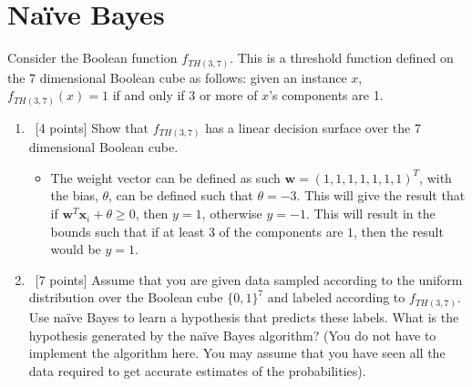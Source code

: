 \section{Na\"ive Bayes}
\label{sec:bayes}
Consider the Boolean function $f_{TH(3,7)}$. This is a threshold
function defined on the 7 dimensional Boolean cube as follows: given
an instance $x$, $f_{TH(3,7)}(x) = 1$ if and only if 3 or more of
$x$'s components are 1.

\begin{enumerate}
\item ~[4 points] Show that $f_{TH(3,7)}$ has a linear decision surface over the 7 dimensional Boolean cube.

\begin{itemize}
\item The weight vector can be defined as such $\mathbf{w}=\left(1,1,1,1,1,1,1\right)^{T}$, with the bias, $\theta$, can be defined such that $\theta = -3$. This will give the result that if $\mathbf{w}^{T}\mathbf{x}_{i}+\theta\geq 0$, then $y=1$, otherwise $y=-1$. This will result in the bounds such that if at least $3$ of the components are $1$, then the result would be $y=1$.
\end{itemize}

\item ~[7 points] Assume that you are given data sampled according to the uniform
  distribution over the Boolean cube $\{0, 1\}^7$ and labeled
  according to $f_{TH(3,7)}$. Use na\"ive Bayes to learn a hypothesis
  that predicts these labels. What is the hypothesis generated by the
  na\"ive Bayes algorithm? (You do not have to implement the algorithm
  here. You may assume that you have seen all the data required to get
  accurate estimates of the probabilities).


\end{enumerate}
